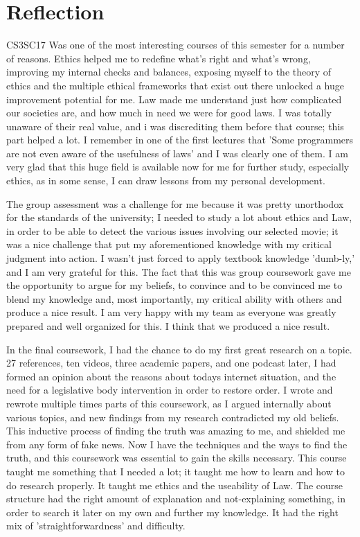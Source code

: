 \documentclass[openany]{article}
\begin{document}
	
	
	\section*{Reflection}
		
		
		CS3SC17 Was one of the most interesting courses of this semester for a number of reasons. Ethics helped me to redefine what's right and what's wrong, 
		improving my internal checks and balances, exposing myself to the theory of ethics and the multiple ethical frameworks that exist out there unlocked 
		a huge improvement potential for me. Law made me understand just how complicated our societies are, and how much in need we were for good laws. 
		I was totally unaware of their real value, and i was discrediting them before that course; this part helped a lot. I remember in one of the first 
		lectures that 'Some programmers are not even aware of the usefulness of laws' and I was clearly one of them. I am very glad that this huge field is 
		available now for me for further study, especially ethics, as in some sense, I can draw lessons from my personal development.
		
		
		The group assessment was a challenge for me because it was pretty unorthodox for the standards of the university; I needed to study a lot about 
		ethics and Law, in order to be able to detect the various issues involving our selected movie; it was a nice challenge that put my aforementioned 
		knowledge with my critical judgment into action. I wasn't just forced to apply textbook knowledge 'dumb-ly,' and I am very grateful for this. 
		The fact that this was group coursework gave me the opportunity to argue for my beliefs, to convince and to be convinced me to blend my 
		knowledge and, most importantly, my critical ability with others and produce a nice result. I am very happy with my team as everyone was 
		greatly prepared and well organized for this. I think that we produced a nice result.
		
		
		In the final coursework, I had the chance to do my first great research on a topic. 27 references, ten videos, three academic papers, and 
		one podcast later, I had formed an opinion about the reasons about todays internet situation, and the need for a legislative body intervention 
		in order to restore order. I wrote and rewrote multiple times parts of this coursework, as I argued internally about various topics, and new 
		findings from my research contradicted my old beliefs. This inductive process of finding the truth was amazing to me, and shielded me from 
		any form of fake news. Now I have the techniques and the ways to find the truth, and this coursework was essential to gain the skills necessary. 
		This course taught me something that I needed a lot; it taught me how to learn and how to do research properly. It taught me ethics and the 
		useability of Law. The course structure had the right amount of explanation and not-explaining something, in order to search it later on my own 
		and further my knowledge. It had the right mix of 'straightforwardness' and difficulty.    
		
\end{document}
